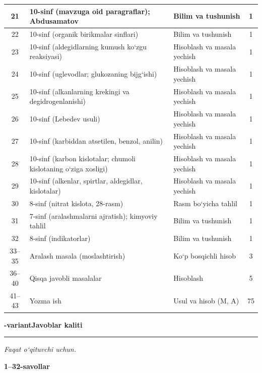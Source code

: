 \documentclass[11pt,a4paper]{article}
\newcommand{\hdrpill}[1]{\begin{tikzpicture}[baseline=0pt]\node[fill=ygreen,text=white,rounded corners=8pt,inner xsep=10pt,inner ysep=5pt,font=\fontsize{13}{15}\bfseries\selectfont] at (0,0.475){#1};\end{tikzpicture}}
\newcommand{\curvar}{}\fancyhead[R]{\hdrpill{\curvar}}
\begin{document}
{\begin{longtable}{|c|p{7.2cm}|p{5.4cm}|c|}
21 & 10-sinf (mavzuga oid paragraflar); Abdusamatov & Bilim va tushunish & 1\\\hline
22 & 10-sinf (organik birikmalar sinflari) & Bilim va tushunish & 1\\\hline
23 & 10-sinf (aldegidlarning kumush ko`zgu reaksiyasi) & Hisoblash va masala yechish & 1\\\hline
24 & 10-sinf (uglevodlar; glukozaning bijg`ishi) & Hisoblash va masala yechish & 1\\\hline
25 & 10-sinf (alkanlarning krekingi va degidrogenlanishi) & Hisoblash va masala yechish & 1\\\hline
26 & 10-sinf (Lebedev usuli) & Hisoblash va masala yechish & 1\\\hline
27 & 10-sinf (karbiddan atsetilen, benzol, anilin) & Hisoblash va masala yechish & 1\\\hline
28 & 10-sinf (karbon kislotalar; chumoli kislotaning o`ziga xosligi) & Hisoblash va masala yechish & 1\\\hline
29 & 10-sinf (alkenlar, spirtlar, aldegidlar, kislotalar) & Hisoblash va masala yechish & 1\\\hline
30 & 8-sinf (nitrat kislota, 28-rasm) & Rasm bo`yicha tahlil & 1\\\hline
31 & 7-sinf (aralashmalarni ajratish); kimyoviy tahlil & Bilim va tushunish & 1\\\hline
32 & 8-sinf (indikatorlar) & Bilim va tushunish & 1\\\hline
33--35 & Aralash masala (moslashtirish) & Ko`p bosqichli hisob & 3\\\hline
36--40 & Qisqa javobli masalalar & Hisoblash & 5\\\hline
41--43 & Yozma ish & Usul va hisob (M, A) & 75\\\hline
\end{longtable}}
\renewcommand{\curvar}{Javoblar}
\newpage
\noindent\textbf{\fontsize{13}{15}-variant}\hfill \textbf{Javoblar kaliti}\par\smallskip\hrule\smallskip
\textit{Faqat o`qituvchi uchun.}\par\medskip
\noindent\textbf{1--32-savollar}\par\smallskip
\end{document}
